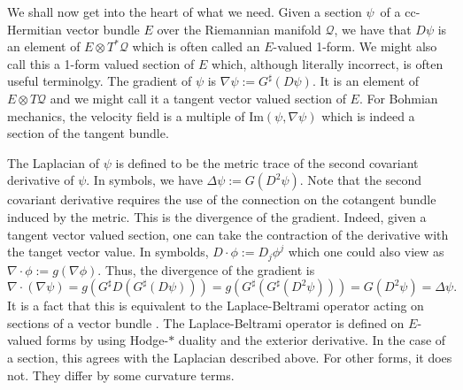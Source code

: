 \documentclass[11pt]{article}
\theoremstyle{remark}
\begin{document}
We shall now get into the heart of what we need. Given a section \ensuremath{\psi}\ 
of a
cc-Hermitian vector bundle $E$ over the Riemannian manifold \ensuremath{\mathcal{Q}},
we have that $D\ensuremath{\psi}$ is an element of $E \otimes \ensuremath{T^{*} \ensuremath{\mathcal{Q}}}$ which is often
called an $E$-valued 1-form. We might also call this a 1-form valued
section of $E$ which, although literally incorrect, is often useful
terminolgy. The gradient of $\ensuremath{\psi}$ is $\nabla \ensuremath{\psi} \ensuremath{:=} G^{\sharp} (D
\ensuremath{\psi})$. It is an element of $E \otimes \ensuremath{T \ensuremath{\mathcal{Q}}}$ and we might call it a
tangent vector valued section of $E$. For Bohmian mechanics, the
velocity field is a multiple of $\textrm{Im} \ensuremath{({\ensuremath{\psi}}, {\nabla \ensuremath{\psi}})}$ which is
  indeed a section of the tangent bundle. 

The Laplacian of $\ensuremath{\psi}$ is defined to be the metric trace of the second
covariant derivative of $\ensuremath{\psi}$. In symbols, we have $\ensuremath{\Delta} \ensuremath{\psi} \ensuremath{:=} 
G(D^2 \ensuremath{\psi})$.  Note that the second covariant derivative requires the
use of the connection on the cotangent bundle induced by the metric.
This is the divergence of the gradient. Indeed, given a
tangent vector valued section, one can take the contraction of the
derivative with the tanget vector value. In symbolds, $D \cdot \phi
\ensuremath{:=} D_{\ensuremath{j}} \phi^{\ensuremath{j}}$ which one could also view as $\nabla
\cdot \phi \ensuremath{:=} g(\nabla \phi)$. Thus, the divergence of the gradient
is 
\[
\nabla \cdot (\nabla \ensuremath{\psi}) = g(G^{\sharp} D (G^{\sharp}( D \ensuremath{\psi}))) =
g(G^{\sharp} (G^{\sharp} (D^2 \ensuremath{\psi}))) = G(D^2 \ensuremath{\psi}) = \ensuremath{\Delta} \ensuremath{\psi} .
\]
It is a fact that this is equivalent to the Laplace-Beltrami operator
acting on sections of a vector bundle \cite{EL83}. The
Laplace-Beltrami operator is defined on $E$-valued forms by using
Hodge-$*$ duality and the exterior derivative. In the case of a
section, this agrees with the Laplacian described above. For other
forms, it does not. They differ by some curvature terms.  
\end{document}
